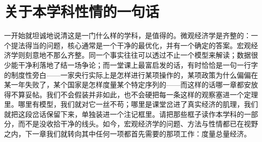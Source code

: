 \section{关于本学科性情的一句话}

一开始就坦诚地说清这是一门什么样的学科，是值得的。微观经济学是齐整的：一个提法得当的问题，核心通常是一个干净的最优化，并有一个确定的答案。宏观经济学则刻意地不那么齐整。同一个事实往往可以透过不止一个模型来解读；数据很少能干净利落地了结一场争论；而一堂课上最富启发的话，有时恰恰是一句一行字的制度性旁白——一家央行实际上是怎样进行某项操作的，某项政策为什么偏偏在某一年失败了，某个国家是怎样度量某个特定序列的——而这样的话哪一章都安放得不算妥帖。我们不会假装并非如此，也不会硬把每一条这样的观察塞进一个定理里。哪里有模型，我们就对它一丝不苟；哪里是课堂岔进了真实经济的肌理，我们就把这段岔话保留下来，单独装进一个注记框里。请把那些框子读作本学科的一部分，而不是没收拾干净的线头。如今，宏观经济学的问题、方法与性情都已在视野之内，下一章我们就转向其中任何一项都首先需要的那项工作：度量总量经济。
